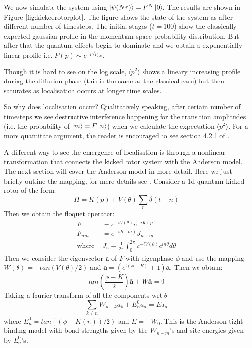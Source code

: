 \documentclass[twocolumn,nobalancelastpage]{report}
\begin{document}
We now simulate the system using $\ket{\psi(N\tau)} = F^N \ket{0}$. The
results are shown in Figure \ref{fig:kickedrotorplot}. The figure shows the
state of the system as after different number of timesteps. The initial
stages ($t = 100$) show the classically expected gaussian profile in the
momentum space probability distribution. But after that the quantum effects
begin to dominate and we obtain a exponentially linear profile i.e. $P(p)
\sim e^{-p/p_{loc}}$.

Though it is hard to see on the log scale, $\langle p^2 \rangle$ shows a
lineary increasing profile during the diffusion phase (this is the same as
the classical case) but then saturates as localisation occurs at longer time
scales.

So why does localisation occur? Qualitatively speaking, after certain
number of timesteps we see destructive interference happening for
the transition amplitudes (i.e. the probability of $\ket{m} = F\ket{n}$)
when we calculate the expectation $\langle p^2 \rangle$. For a more
quantitate argument, the reader is encouraged to see section 4.2.1 of
\cite{stockmann}.

A different way to see the emergence of localisation is through a nonlinear
transformation that connects the kicked rotor system with the Anderson model.
The next section will cover the Anderson model in more detail. Here we just
briefly outline the mapping, for more details see \cite{stockmann}.
Consider a 1d quantum kicked rotor of the form:
\begin{equation}
    H = K(p) + V(\theta)\sum_{n} \delta(t - n)
\end{equation}
Then we obtain the floquet operator:
\begin{align}
    F &= e^{-iV(\theta)} e^{-iK(p)} \\
    F_{nm} &= e^{-iK(m)} J_{n-m} \\
    \text{where } & J_n = \frac{1}{2\pi} \int_0^{2\pi} e^{-iV(\theta)}
    e^{in\theta} d\theta
\end{align}
Then we consider the eigenvector $\mathbf{a}$ of $F$ with eigenphase $\phi$
and use the mapping $W(\theta) = -tan(V(\theta) / 2)$ and $\bar{\mathbf{a}}
= (e^{i(\phi - K)} + 1)\mathbf{a}$. Then we obtain:
\begin{equation}
    tan\left(\frac{\phi - K}{2}\right) \bar{\mathbf{a}} + W\bar{\mathbf{a}} = 0
\end{equation}
Taking a fourier transform of all the components wrt $\theta$
\begin{equation}
    \sum_{k \neq n} W_{n-k} \bar{a_k} + E^0_n \bar{a_n} = E \bar{a_n}
\end{equation}
where $E_n^0 = tan((\phi - K(n)) / 2)$ and $E = -W_0$. This is the Anderson
tight-binding model with bond strengths given by the $W_{n-m}$'s and site
energies given by $E^0_n$'s.
\end{document}

